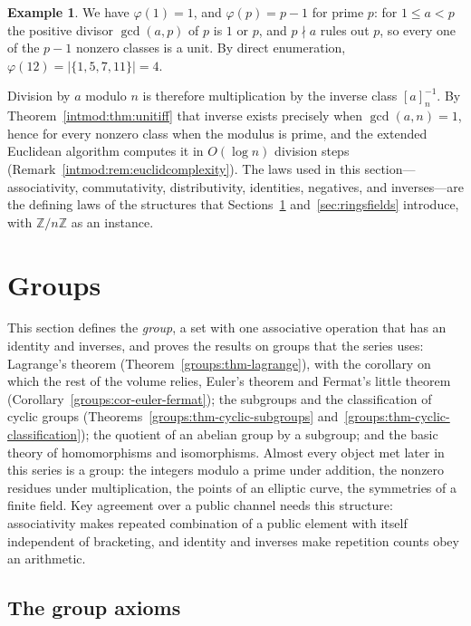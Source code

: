 \documentclass[11pt,a4paper]{article}
\theoremstyle{definition}
\newtheorem{example}[theorem]{Example}
\theoremstyle{remark}
\newcommand{\Z}{\ensuremath{\mathbb{Z}}}
\begin{document}
\begin{example}\label{intmod:exa:totient}
We have \(\varphi(1)=1\), and \(\varphi(p)=p-1\) for prime \(p\): for
\(1\le a<p\) the positive divisor \(\gcd(a,p)\) of \(p\) is \(1\) or \(p\),
and \(p\nmid a\) rules out \(p\), so every one of the \(p-1\) nonzero classes
is a unit. By direct enumeration, \(\varphi(12)=\lvert\{1,5,7,11\}\rvert=4\).
\end{example}

Division by \(a\) modulo \(n\) is therefore multiplication by the inverse
class \([a]_n^{-1}\). By Theorem~\ref{intmod:thm:unitiff} that inverse exists
precisely when \(\gcd(a,n)=1\), hence for every nonzero class when the
modulus is prime, and the extended Euclidean algorithm computes it in
\(O(\log n)\) division steps (Remark~\ref{intmod:rem:euclidcomplexity}). The
laws used in this section---associativity, commutativity, distributivity,
identities, negatives, and inverses---are the defining laws of the structures
that Sections~\ref{sec:groups} and~\ref{sec:ringsfields} introduce, with
\(\Z/n\Z\) as an instance.

\section{Groups}\label{sec:groups}

This section defines the \emph{group}, a set with one associative operation
that has an identity and inverses, and proves the results on groups that the
series uses: Lagrange's theorem (Theorem~\ref{groups:thm-lagrange}), with
the corollary on which the rest of the volume relies, Euler's theorem and
Fermat's little theorem (Corollary~\ref{groups:cor-euler-fermat}); the
subgroups and the classification of cyclic groups
(Theorems~\ref{groups:thm-cyclic-subgroups}
and~\ref{groups:thm-cyclic-classification}); the quotient of an abelian group
by a subgroup; and the basic theory of homomorphisms and isomorphisms. Almost
every object met later in this series is a group: the integers modulo a prime
under addition, the nonzero residues under multiplication, the points of an
elliptic curve, the symmetries of a finite field. Key agreement over a public
channel needs this structure: associativity makes repeated combination of a
public element with itself independent of bracketing, and identity and
inverses make repetition counts obey an arithmetic.

\subsection{The group axioms}\label{groups:sub:axioms}
\end{document}

